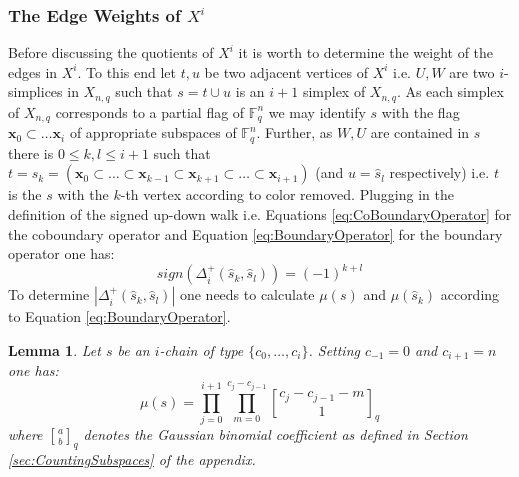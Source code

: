 \documentclass[11pt]{amsart}
\newtheorem{lemma}[theorem]{Lemma}
\newcommand{\gBinom}{\genfrac{[}{]}{0pt}{}}
\begin{document}
    \subsubsection{The Edge Weights of $X^i$}
    \label{sec:EdgeWeights}
    Before discussing the quotients of $X^i$ it is worth to determine the weight of the edges in $X^i$. To this end let $t,u$ be two adjacent vertices of $X^i$ i.e. $U,W$ are two $i$-simplices in $X_{n,q}$ such that $s=t\cup u$ is an $i+1$ simplex of $X_{n,q}$. As each simplex of $X_{n,q}$ corresponds to a partial flag of $\mathbb{F}_q^n$ we may identify $s$ with the flag $\mathbf{x}_0\subset\dots \mathbf{x}_i$ of appropriate subspaces of $\mathbb{F}_q^n$. Further, as $W,U$ are contained in $s$ there is $0\leq k,l\leq i+1$ such that $t=\hat{s}_k=(\mathbf{x}_0\subset\dots\subset \mathbf{x}_{k-1}\subset \mathbf{x}_{k+1}\subset\dots \subset \mathbf{x}_{i+1})$ (and $u=\hat{s}_l$ respectively) i.e. $t$ is the $s$  with the $k$-th vertex according to color removed. Plugging in the definition of the signed up-down walk i.e. Equations \ref{eq:CoBoundaryOperator} for the coboundary operator and Equation \ref{eq:BoundaryOperator} for the boundary operator one has:
    \begin{equation}
        sign(\Delta_i^+(\hat{s}_k,\hat{s}_l))=(-1)^{k+l}
    \end{equation}
    To determine $|\Delta_i^+(\hat{s}_k, \hat{s}_l)|$ one needs to calculate $\mu(s)$ and $\mu(\hat{s}_k)$ according to Equation \ref{eq:BoundaryOperator}. 
    \begin{lemma}
        Let $s$ be an $i$-chain of type $\{c_0,\dots, c_i\}$. Setting $c_{-1}=0$ and $c_{i+1}=n$ one has:
        \begin{equation}
            \mu(s)=\prod_{j=0}^{i+1}\prod_{m=0}^{c_j-c_{j-1}}\gBinom{c_j-c_{j-1}-m}{1}_q
            \label{eq:SimplexWeight}
        \end{equation}
        where $\gBinom{a}{b}_q$ denotes the Gaussian binomial coefficient as defined in Section \ref{sec:CountingSubspaces} of the appendix. 
    \end{lemma}
\end{document}
